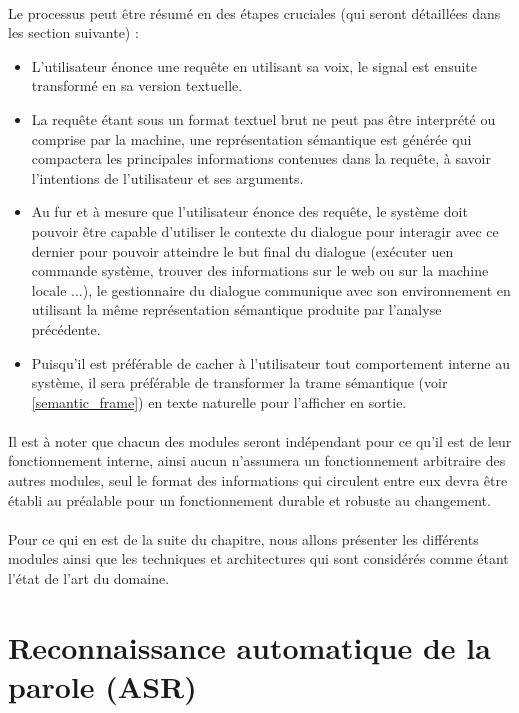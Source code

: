 	\paragraph{}
	Le processus peut être résumé en des étapes cruciales (qui seront détaillées dans les section suivante) : 
	\begin{itemize}
		\item L'utilisateur énonce une requête en utilisant sa voix, le signal est ensuite transformé en sa version textuelle.
		\item La requête étant sous un format textuel brut ne peut pas être interprété ou comprise par la machine, une représentation sémantique est générée qui compactera les principales informations contenues dans la requête, à savoir l'intentions de l'utilisateur et ses arguments.
		\item Au fur et à mesure que l'utilisateur énonce des requête, le système doit pouvoir être capable d'utiliser le contexte du dialogue pour interagir avec ce dernier pour pouvoir atteindre le but final du dialogue (exécuter uen commande système, trouver des informations sur le web ou sur la machine locale ...), le gestionnaire du dialogue communique avec son environnement en utilisant la même représentation sémantique produite par l'analyse précédente.
		\item Puisqu'il est préférable de cacher à l'utilisateur tout comportement interne au système, il sera préférable de transformer la trame sémantique (voir \ref{semantic_frame}) en texte naturelle pour l'afficher en sortie.
	\end{itemize}
	\paragraph{}
	Il est à noter que chacun des modules seront indépendant pour ce qu'il est de leur fonctionnement interne, ainsi aucun n'assumera un fonctionnement arbitraire des autres modules, seul le format des informations qui circulent entre eux devra être établi au préalable pour un fonctionnement durable et robuste au changement.
	\paragraph{}
	Pour ce qui en est de la suite du chapitre, nous allons présenter les différents modules ainsi que les techniques et architectures qui sont considérés comme étant l'état de l'art du domaine. 
\section{Reconnaissance automatique de la parole (ASR)}
